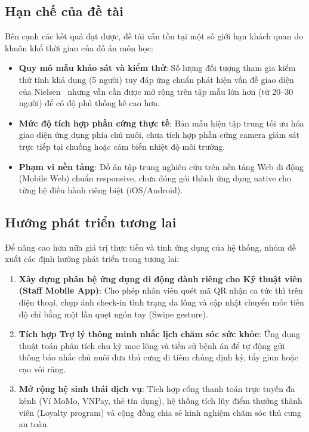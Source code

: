 \subsection{Hạn chế của đề tài}
Bên cạnh các kết quả đạt được, đề tài vẫn tồn tại một số giới hạn khách quan do khuôn khổ thời gian của đồ án môn học:
\begin{itemize}
    \item \textbf{Quy mô mẫu khảo sát và kiểm thử}: Số lượng đối tượng tham gia kiểm thử tính khả dụng (5 người) tuy đáp ứng chuẩn phát hiện vấn đề giao diện của Nielsen~\cite{Nielsen1994} nhưng vẫn cần được mở rộng trên tập mẫu lớn hơn (từ 20--30 người) để có độ phủ thống kê cao hơn.
    \item \textbf{Mức độ tích hợp phần cứng thực tế}: Bản mẫu hiện tập trung tối ưu hóa giao diện ứng dụng phía chủ nuôi, chưa tích hợp phần cứng camera giám sát trực tiếp tại chuồng hoặc cảm biến nhiệt độ môi trường.
    \item \textbf{Phạm vi nền tảng}: Đồ án tập trung nghiên cứu trên nền tảng Web di động (Mobile Web) chuẩn responsive, chưa đóng gói thành ứng dụng native cho từng hệ điều hành riêng biệt (iOS/Android).
\end{itemize}

\subsection{Hướng phát triển tương lai}
Để nâng cao hơn nữa giá trị thực tiễn và tính ứng dụng của hệ thống, nhóm đề xuất các định hướng phát triển trong tương lai:
\begin{enumerate}
    \item \textbf{Xây dựng phân hệ ứng dụng di động dành riêng cho Kỹ thuật viên (Staff Mobile App)}: Cho phép nhân viên quét mã QR nhận ca tức thì trên điện thoại, chụp ảnh check-in tình trạng da lông và cập nhật chuyển mốc tiến độ chỉ bằng một lần quẹt ngón tay (Swipe gesture).
    \item \textbf{Tích hợp Trợ lý thông minh nhắc lịch chăm sóc sức khỏe}: Ứng dụng thuật toán phân tích chu kỳ mọc lông và tiền sử bệnh án để tự động gửi thông báo nhắc chủ nuôi đưa thú cưng đi tiêm chủng định kỳ, tẩy giun hoặc cạo vôi răng.
    \item \textbf{Mở rộng hệ sinh thái dịch vụ}: Tích hợp cổng thanh toán trực tuyến đa kênh (Ví MoMo, VNPay, thẻ tín dụng), hệ thống tích lũy điểm thưởng thành viên (Loyalty program) và cộng đồng chia sẻ kinh nghiệm chăm sóc thú cưng an toàn.
\end{enumerate}
